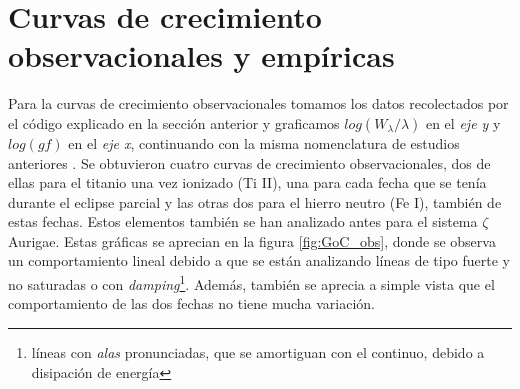 \documentclass[12pt,oneside,openany,letter]{book}
\begin{document}

\section{Curvas de crecimiento observacionales y empíricas}

Para la curvas de crecimiento observacionales tomamos los datos recolectados por el código explicado en la sección anterior y graficamos $log(W_{\lambda}/\lambda)$ en el \textit{eje y} y $log(gf)$ en el \textit{eje x}, continuando con la misma nomenclatura de estudios anteriores \citep{kps1O}. Se obtuvieron cuatro curvas de crecimiento observacionales, dos de ellas para el titanio una vez ionizado (Ti II), una para cada fecha que se tenía durante el eclipse parcial y las otras dos para el hierro neutro (Fe I), también de estas fechas. Estos elementos también se han analizado antes para el sistema $\zeta$ Aurigae. Estas gráficas se aprecian en la figura \ref{fig:GoC_obs}, donde se observa un comportamiento lineal debido a que se están analizando líneas de tipo fuerte y no saturadas o con \textit{damping}\footnote{líneas con \textit{alas} pronunciadas, que se amortiguan con el continuo, debido a disipación de energía}. Además, también se aprecia a simple vista que el comportamiento de las dos fechas no tiene mucha variación.
\end{document}
